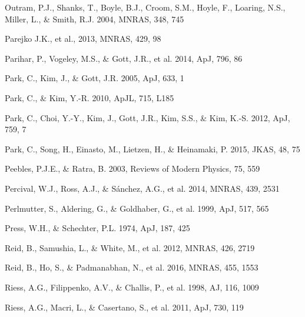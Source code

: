 \documentclass[prl,twocolumn,superscriptaddress,aps,amsmath,amssymb,nofootinbib,altaffilletter]{revtex4}
\begin{document}
\begin{thebibliography}{}
Outram, P.J., Shanks, T., Boyle, B.J., Croom, S.M., Hoyle, F., Loaring, N.S., 
Miller, L., \& Smith, R.J. 2004, MNRAS, 348, 745  


Parejko J.K., et al., 2013, MNRAS, 429, 98

Parihar, P., Vogeley, M.S., \& Gott, J.R., et al. 2014, ApJ, 796, 86

Park, C., Kim, J., \& Gott, J.R. 2005, ApJ, 633, 1  

Park, C., \& Kim, Y.-R. 2010, ApJL, 715, L185  

Park, C., Choi, Y.-Y., Kim, J., Gott, J.R., Kim, S.S., \&
Kim, K.-S. 2012, ApJ, 759, 7

Park, C., Song, H., Einasto, M., Lietzen, H., \&
Heinamaki, P. 2015, JKAS, 48, 75

Peebles, P.J.E., \& Ratra, B. 2003, Reviews of Modern Physics, 75, 559

Percival, W.J., Ross, A.J., \& S\'{a}nchez, A.G., et al. 2014, MNRAS, 439, 2531

Perlmutter, S., Aldering, G., \& Goldhaber, G., et al. 1999, ApJ, 517, 565  

Press, W.H., \& Schechter, P.L. 1974, ApJ, 187, 425



Reid, B., Samushia, L., \& White, M., et al. 2012, MNRAS, 426, 2719  

Reid, B., Ho, S., \& Padmanabhan, N., et al.  2016, MNRAS, 455, 1553

Riess, A.G., Filippenko, A.V., \& Challis, P., et al. 1998, AJ, 116, 1009  

Riess, A.G., Macri, L., \& Casertano, S., et al. 2011, ApJ, 730, 119


\end{thebibliography}
\end{document}
